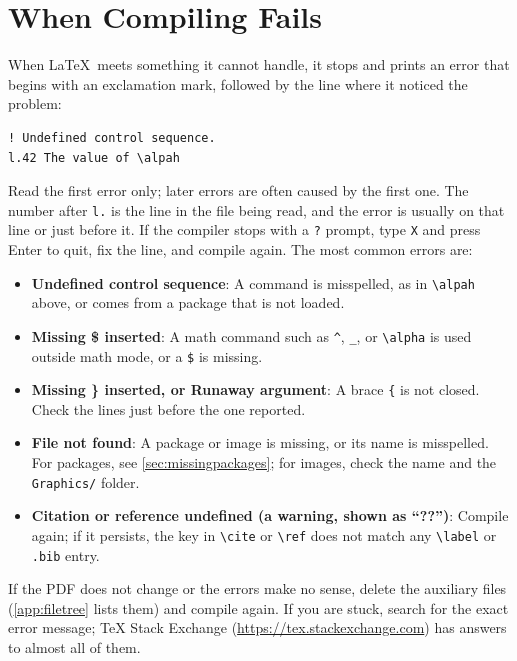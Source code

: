 \section{When Compiling Fails}
\label{sec:errors}
When \LaTeX\ meets something it cannot handle, it stops and prints an error that begins with an exclamation mark, followed by the line where it noticed the problem:
\begin{verbatim}
! Undefined control sequence.
l.42 The value of \alpah
\end{verbatim}
Read the first error only; later errors are often caused by the first one. The number after \texttt{l.} is the line in the file being read, and the error is usually on that line or just before it. If the compiler stops with a \texttt{?} prompt, type \texttt{X} and press Enter to quit, fix the line, and compile again. The most common errors are:
\begin{itemize}
\item \textbf{Undefined control sequence}: A command is misspelled, as in \verb+\alpah+ above, or comes from a package that is not loaded.
\item \textbf{Missing \$ inserted}: A math command such as \verb+^+, \verb+_+, or \verb+\alpha+ is used outside math mode, or a \verb+$+ is missing.
\item \textbf{Missing \} inserted, or Runaway argument}: A brace \verb+{+ is not closed. Check the lines just before the one reported.
\item \textbf{File not found}: A package or image is missing, or its name is misspelled. For packages, see \cref{sec:missingpackages}; for images, check the name and the \texttt{Graphics/} folder.
\item \textbf{Citation or reference undefined (a warning, shown as ``??'')}: Compile again; if it persists, the key in \verb+\cite+ or \verb+\ref+ does not match any \verb+\label+ or \texttt{.bib} entry.
\end{itemize}
If the PDF does not change or the errors make no sense, delete the auxiliary files (\cref{app:filetree} lists them) and compile again. If you are stuck, search for the exact error message; TeX Stack Exchange (\url{https://tex.stackexchange.com}) has answers to almost all of them.
